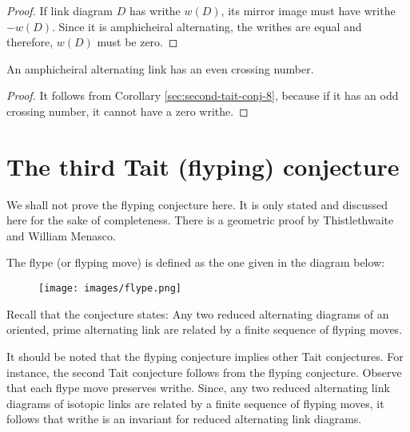 \begin{proof}
\label{sec:second-tait-conj-10}
If link diagram $D$ has writhe $w(D)$, its mirror image must have writhe $-w(D)$. Since it is amphicheiral alternating, the writhes are equal and therefore, $w(D)$ must be zero.
\end{proof}

\begin{corollary}
\label{sec:second-tait-conj-9}
  An amphicheiral alternating link has an even crossing number.
\end{corollary}

\begin{proof}
\label{sec:second-tait-conj-11}
  It follows from Corollary \ref{sec:second-tait-conj-8}, because if it has an odd crossing number, it cannot have a zero writhe.
\end{proof}

\section{The third Tait (flyping) conjecture}

We shall not prove the flyping conjecture here. It is only stated and discussed here for the sake of completeness. There is a geometric proof by Thistlethwaite and William Menasco.

The flype (or flyping move) is defined as the one given in the diagram below:

\begin{figure}[h]
  \centering
  \texttt{[image: images/flype.png]}
\end{figure}

Recall that the conjecture states: Any two reduced alternating diagrams of an
oriented, prime alternating link are related by a finite sequence of flyping moves.

It should be noted that the flyping conjecture implies other Tait conjectures. For instance, the second Tait conjecture follows from the flyping conjecture. Observe that each flype move preserves writhe. Since, any two reduced alternating link diagrams of isotopic links are related by a finite sequence of flyping moves, it follows that writhe is an invariant for reduced alternating link diagrams. 